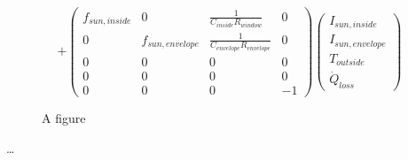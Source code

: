 \begin{landscape}
\begin{equation*}
	+
	\begin{pmatrix}
         f_{sun,inside} & 0 & \frac{1}{C_{inside}R_{window}} & 0\\
         0 & f_{sun,envelope} & \frac{1}{C_{envelope}R_{envelope}}&0\\
         0 & 0 & 0& 0\\
         0 & 0 & 0& 0\\
         0 & 0 & 0 & -1
    \end{pmatrix}
	\left(\begin{array}{c} I_{sun,inside}\\ I_{sun,envelope}\\ T_{outside} \\ \dot{Q}_{loss} \end{array}\right)
	\end{equation*}	
	
\end{landscape}


\setcounter{figure}{0}
		
\begin{figure} [ht]
  \centering
  \caption{A figure}
  \label{fig:anotherfigure}
\end{figure}


\dots